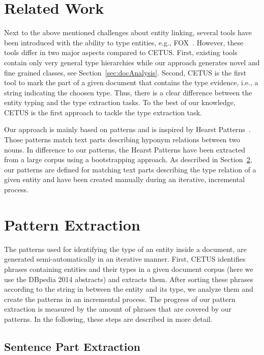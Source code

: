 \section{Related Work}

Next to the above mentioned challenges about entity linking, several tools have been introduced with the ability to type entities, e.g., FOX~\cite{FOX}.
However, these tools differ in two major aspects compared to CETUS.
First, existing tools contain only very general type hierarchies while our approach generates novel and fine grained classes, see Section~\ref{sec:docAnalysis}.
Second, CETUS is the first tool to mark the part of a given document that contains the type evidence, i.e., a string indicating the choosen type.
Thus, there is a clear difference between the entity typing and the type extraction tasks.
To the best of our knowledge, CETUS is the first approach to tackle the type extraction task.

Our approach is mainly based on patterns and is inspired by  Hearst Patterns~\cite{Hearst1992}.
Those patterns match text parts describing hyponym relations between two nouns.
In difference to our patterns, the Hearst Patterns have been extracted from a large corpus using a bootstrapping approach.
As described in Section~\ref{sec:patternExt}, our patterns are defined for matching text parts describing the type relation of a given entity and have been created manually during an iterative, incremental process.

\section{Pattern Extraction}
\label{sec:patternExt}

The patterns used for identifying the type of an entity inside a document, are generated semi-automatically in an iterative manner.
First, CETUS identifies phrases containing entities and their types in a given document corpus (here we use the DBpedia 2014 abstracts) and extracts them.
After sorting these phrases according to the string in between the entity and its type, we analyze them and create the patterns in an incremental process.
The progress of our pattern extraction is measured by the amount of phrases that are covered by our patterns.
In the following, these steps are described in more detail.

\subsection{Sentence Part Extraction}

